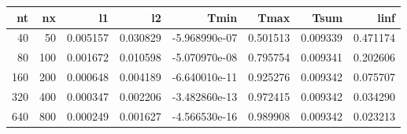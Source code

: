 \begin{tabular}{rrrrrrrr}
\toprule
  nt &   nx &        l1 &        l2 &          Tmin &      Tmax &      Tsum &      linf \\
\midrule
  40 &   50 &  0.005157 &  0.030829 & -5.968990e-07 &  0.501513 &  0.009339 &  0.471174 \\
  80 &  100 &  0.001672 &  0.010598 & -5.070970e-08 &  0.795754 &  0.009341 &  0.202606 \\
 160 &  200 &  0.000648 &  0.004189 & -6.640010e-11 &  0.925276 &  0.009342 &  0.075707 \\
 320 &  400 &  0.000347 &  0.002206 & -3.482860e-13 &  0.972415 &  0.009342 &  0.034290 \\
 640 &  800 &  0.000249 &  0.001627 & -4.566530e-16 &  0.989908 &  0.009342 &  0.023213 \\
\bottomrule
\end{tabular}
